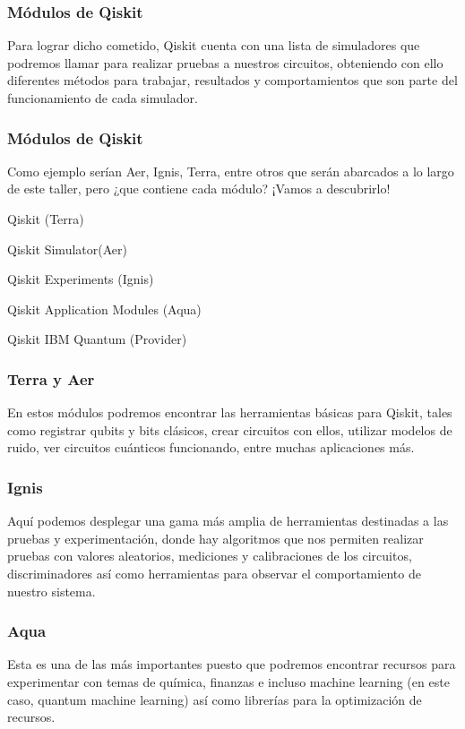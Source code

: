 \documentclass[spanish]{beamer}
\begin{document}
\newpage\justify\setlength{\parskip}{5mm}
\begin{frame}\frametitle{Módulos de Qiskit} 
Para lograr dicho cometido, Qiskit cuenta con una lista de simuladores que podremos llamar para realizar pruebas a nuestros circuitos, obteniendo con ello diferentes métodos para trabajar, resultados y comportamientos que son parte del funcionamiento de cada simulador. 
\end{frame} 

\newpage\justify\setlength{\parskip}{5mm}
\begin{frame}\frametitle{Módulos de Qiskit} 
Como ejemplo serían Aer, Ignis, Terra, entre otros que serán abarcados a lo largo de este taller, pero ¿que contiene cada módulo? ¡Vamos a descubrirlo!
\begin{itemsize}
\item Qiskit (Terra)
    \item Qiskit Simulator(Aer)
    \item Qiskit Experiments (Ignis)
    \item Qiskit Application Modules (Aqua)
    \item Qiskit IBM Quantum (Provider)
\end{itemsize}
\end{frame} 

\newpage\justify\setlength{\parskip}{5mm}
\begin{frame}\frametitle{Terra y Aer} 
En estos módulos podremos encontrar las herramientas básicas para Qiskit, tales como registrar qubits y bits clásicos, crear circuitos con ellos, utilizar modelos de ruido, ver circuitos cuánticos funcionando, entre muchas aplicaciones más.
\end{frame} 

\newpage\justify\setlength{\parskip}{5mm}
\begin{frame}\frametitle{Ignis} 
Aquí podemos desplegar una gama más amplia de herramientas destinadas a las pruebas y experimentación, donde hay algoritmos que nos permiten realizar pruebas con valores aleatorios, mediciones y calibraciones de los circuitos, discriminadores  así como herramientas para observar el comportamiento de nuestro sistema.
\end{frame} 

\newpage\justify\setlength{\parskip}{5mm}
\begin{frame}\frametitle{Aqua} 
Esta es una de las más importantes puesto que podremos encontrar recursos para experimentar con temas de química, finanzas e incluso machine learning (en este caso, quantum machine learning) así como librerías para la optimización de recursos.
\end{frame} 
\end{document}

